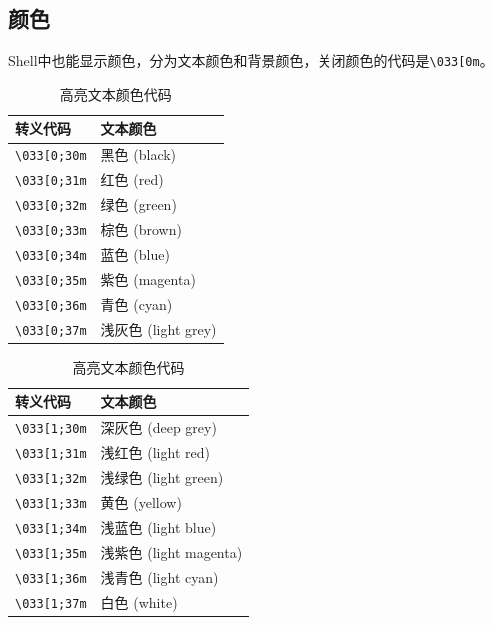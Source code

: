 \subsection{颜色}
Shell中也能显示颜色，分为文本颜色和背景颜色，关闭颜色的代码是\verb|\033[0m|。
\begin{table}[H]
	\centering
	\begin{minipage}{0.45\linewidth}
		\centering
		\begin{tabular}{|l|l|}
			\hline
			\textbf{转义代码}     & \textbf{文本颜色}    \\
			\hline
			\verb|\033[0;30m| & 黑色 (black)       \\
			\verb|\033[0;31m| & 红色 (red)         \\
			\verb|\033[0;32m| & 绿色 (green)       \\
			\verb|\033[0;33m| & 棕色 (brown)       \\
			\verb|\033[0;34m| & 蓝色 (blue)        \\
			\verb|\033[0;35m| & 紫色 (magenta)     \\
			\verb|\033[0;36m| & 青色 (cyan)        \\
			\verb|\033[0;37m| & 浅灰色 (light grey) \\
			\hline
		\end{tabular}
		\caption{常用文本颜色代码}
	\end{minipage}
	\hfill
	\begin{minipage}{0.45\linewidth}
		\centering
		\begin{tabular}{|l|l|}
			\hline
			\textbf{转义代码}     & \textbf{文本颜色}       \\
			\hline
			\verb|\033[1;30m| & 深灰色 (deep grey)     \\
			\verb|\033[1;31m| & 浅红色 (light red)     \\
			\verb|\033[1;32m| & 浅绿色 (light green)   \\
			\verb|\033[1;33m| & 黄色 (yellow)         \\
			\verb|\033[1;34m| & 浅蓝色 (light blue)    \\
			\verb|\033[1;35m| & 浅紫色 (light magenta) \\
			\verb|\033[1;36m| & 浅青色 (light cyan)    \\
			\verb|\033[1;37m| & 白色 (white)          \\
			\hline
		\end{tabular}
		\caption{高亮文本颜色代码}
	\end{minipage}
\end{table}

